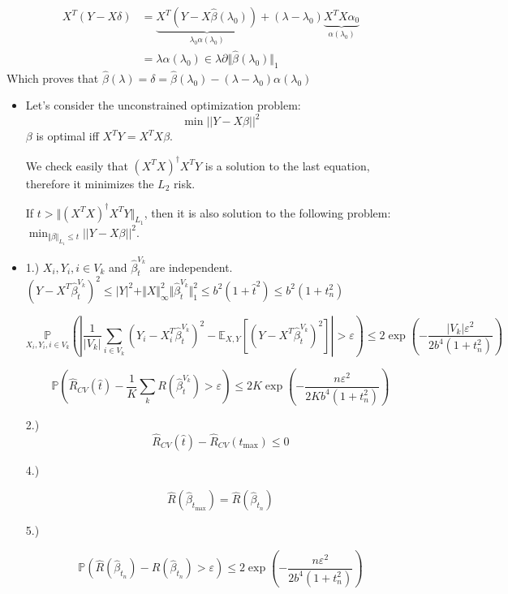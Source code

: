 \documentclass[12pt]{article}
\newcommand{\hbeta}{\hat \beta }
\newcommand{\esp}{{\mathbb E}}
\newcommand{\pr}{{\mathbb P}}
\newcommand{\norm}[1]{\Vert #1 \Vert}
\begin{document}
\begin{itemize}
  
  \begin{align*}
    X^T(Y - X\delta)
    &= \underbrace{X^T(Y - X\hat \beta(\lambda_0))}_{\lambda_0 \alpha(\lambda_0)} + (\lambda - \lambda_0) \underbrace{X^T X \alpha_0}_{\alpha(\lambda_0)}
    \\&= \lambda \alpha(\lambda_0) \in \lambda \partial \norm{\hat \beta(\lambda_0)}_1
  \end{align*}
  Which proves that $\hat \beta(\lambda) = \delta = \hat \beta(\lambda_0) - (\lambda - \lambda_0) \alpha(\lambda_0)$

  

\end{itemize}

\begin{itemize}
\item

  Let's consider the unconstrained optimization problem:
  $$\min ||Y - X \beta||^2$$
  $\beta$ is optimal iff $X^TY = X^TX\beta$.
  
  We check easily that $(X^TX)^{\dagger}X^TY$ is a solution to the last equation, therefore it minimizes the $L_2$ risk.
  
  If $t > \norm{(X^TX)^{\dagger}X^TY}_{L_1}$, then it is also solution to the following problem:   $\min_{\norm{\beta}_{L_1} \le t} ||Y - X \beta||^2$.
  
\item
  1.)
  $X_i, Y_i, i \in V_k$ and $\hbeta_{\hat t}^{V_k}$ are independent.
  $(Y - X^T \hbeta_{\hat t}^{V_k})^2 \le |Y|^2 + \norm{X}_{\infty}^2  \norm{\hbeta_{\hat t}^{V_k}}_1^2 \le b^2 (1 + \hat t^2) \le b^2(1 + t_n^2)$
  
  $$\underset{X_i, Y_i, i \in V_k}{\pr} \left( \left|\frac{1}{|V_k|} \sum_{i \in V_k} (Y_i - X_i^T\hbeta_{\hat t}^{V_k})^2 - \esp_{X, Y}[(Y - X^T\hbeta_{\hat t}^{V_k})^2]\right| > \varepsilon\right) \le 2 \exp( - \frac{|V_k| \varepsilon^2}{2b^4(1 + t_n^2)}) $$

  $${\pr} \left( \hat R_{CV}(\hat t) - \frac1K \sum_k R(\hbeta^{V_k}_{\hat t}) > \varepsilon\right) \le 2K \exp( - \frac{n \varepsilon^2}{2Kb^4(1 + t_n^2)}) $$


  2.)
  $$\hat R_{CV}(\hat t) - \hat R_{CV}(t_{\max}) \le 0$$

  
  4.)

  $$\hat R(\hbeta_{t_{\max}}) = \hat R(\hbeta_{t_n})$$
  
  5.)

  $$ \pr(\hat R(\hbeta_{t_n}) - R(\hbeta_{t_n}) > \varepsilon) \le 2 \exp(-\frac{n \varepsilon^2}{2b^4(1+t_n^2)})$$

\end{itemize}
\end{document}
